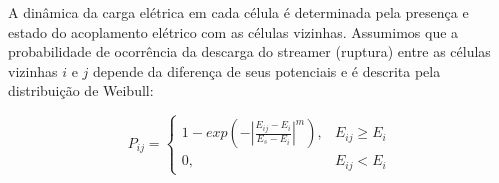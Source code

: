 \documentclass[a4paper, 12pt, onecolumn,singlespacing]{article}
\begin{document}
	A dinâmica da carga elétrica em cada célula é determinada pela presença e estado do acoplamento elétrico com as células vizinhas. Assumimos que a probabilidade de ocorrência da descarga do streamer (ruptura) entre as células vizinhas $i$ e $j$ depende da diferença de seus potenciais e é descrita pela distribuição de Weibull:
	
	\begin{equation}
		P_{ij} = \begin{cases}
					1 - exp \left( -\left| \frac{E_{ij} - E_i}{E_s - E_i} \right|^m\right ), &  E_{ij} \geq E_i \\ 
					0, & E_{ij} < E_i 
				 \end{cases}
	\end{equation}
	
	
	
	
\end{document}
